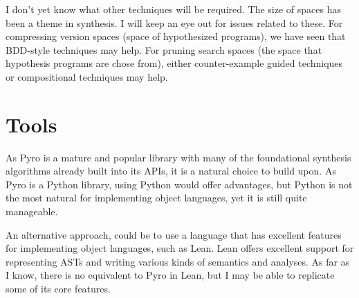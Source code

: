 \documentclass[runningheads]{llncs}
\begin{document}
I don't yet know what other techniques will be required. The size of spaces has been a theme in synthesis.
I will keep an eye out for issues related to these. 
For compressing version spaces (space of hypothesized programs), we have seen that BDD-style techniques may help.
For pruning search spaces (the space that hypothesis programs are chose from), 
either counter-example guided techniques or compositional techniques may help. 

\section{Tools}
As Pyro is a mature and popular library with many of the foundational synthesis algorithms already built into its APIs, 
it is a natural choice to build upon.
As Pyro is a Python library, using Python would offer advantages, 
but Python is not the most natural for implementing object languages, yet it is still quite manageable. 

An alternative approach, could be to use a language that has excellent features for implementing object languages, 
such as Lean.
Lean offers excellent support for representing ASTs and writing various kinds of semantics and analyses.
As far as I know, there is no equivalent to Pyro in Lean, but I may be able to replicate some of its core features.
\end{document}
